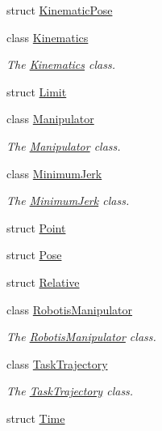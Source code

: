 \begin{DoxyCompactItemize}
struct \hyperlink{structrobotis__manipulator_1_1_kinematic_pose}{Kinematic\+Pose}
\item 
class \hyperlink{classrobotis__manipulator_1_1_kinematics}{Kinematics}
\begin{DoxyCompactList}\small\item\em The \hyperlink{classrobotis__manipulator_1_1_kinematics}{Kinematics} class. \end{DoxyCompactList}\item 
struct \hyperlink{structrobotis__manipulator_1_1_limit}{Limit}
\item 
class \hyperlink{classrobotis__manipulator_1_1_manipulator}{Manipulator}
\begin{DoxyCompactList}\small\item\em The \hyperlink{classrobotis__manipulator_1_1_manipulator}{Manipulator} class. \end{DoxyCompactList}\item 
class \hyperlink{classrobotis__manipulator_1_1_minimum_jerk}{Minimum\+Jerk}
\begin{DoxyCompactList}\small\item\em The \hyperlink{classrobotis__manipulator_1_1_minimum_jerk}{Minimum\+Jerk} class. \end{DoxyCompactList}\item 
struct \hyperlink{structrobotis__manipulator_1_1_point}{Point}
\item 
struct \hyperlink{structrobotis__manipulator_1_1_pose}{Pose}
\item 
struct \hyperlink{structrobotis__manipulator_1_1_relative}{Relative}
\item 
class \hyperlink{classrobotis__manipulator_1_1_robotis_manipulator}{Robotis\+Manipulator}
\begin{DoxyCompactList}\small\item\em The \hyperlink{classrobotis__manipulator_1_1_robotis_manipulator}{Robotis\+Manipulator} class. \end{DoxyCompactList}\item 
class \hyperlink{classrobotis__manipulator_1_1_task_trajectory}{Task\+Trajectory}
\begin{DoxyCompactList}\small\item\em The \hyperlink{classrobotis__manipulator_1_1_task_trajectory}{Task\+Trajectory} class. \end{DoxyCompactList}\item 
struct \hyperlink{structrobotis__manipulator_1_1_time}{Time}
\item 

\end{DoxyCompactItemize}
